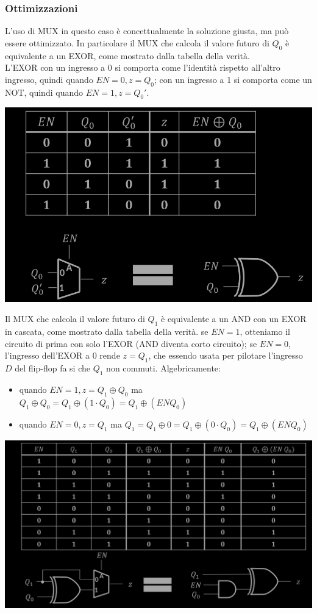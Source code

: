 \documentclass{article}
\begin{document}
\subsubsection{Ottimizzazioni}
L’uso di MUX in questo caso è concettualmente la soluzione giusta, ma può essere ottimizzato. In particolare il MUX che calcola il valore futuro di $Q_0$ è equivalente a un EXOR, come mostrato dalla tabella della verità.\\
L'EXOR con un ingresso a 0 si comporta come l’identità rispetto all’altro ingresso, quindi quando $EN=0,z=Q_0$; con un ingresso a 1 si comporta come un NOT, quindi quando $EN=1,z = Q_0'$.
\begin{center}
    \includegraphics[scale=0.35]{ottimizzazioni.png}
\end{center}
Il MUX che calcola il valore futuro di $Q_1$ è equivalente a un AND con un EXOR in cascata, come mostrato dalla tabella della verità. se $EN=1$, otteniamo il circuito di prima con solo l'EXOR (AND diventa corto circuito); se $EN = 0$, l’ingresso dell’EXOR a 0 rende $z = Q_1$, che essendo usata per pilotare l’ingresso $D$ del flip-flop fa si che $Q_1$ non commuti.
Algebricamente:
\begin{itemize}
    \item quando $EN=1, z=Q_1 \oplus Q_0$ ma $Q_1 \oplus Q_0 = Q_1 \oplus(1 \cdot Q_0) = Q_1 \oplus (EN Q_0)$
    \item quando $EN=0, z=Q_1$ ma $Q_1 = Q_1 \oplus0 = Q_1 \oplus (0\cdot Q_0) = Q_1 \oplus (EN Q_0)$
\end{itemize}
\begin{center}
    \includegraphics[scale=0.35]{ottimizzazioni2.png}
\end{center}
\end{document}
